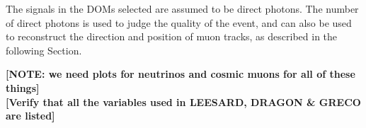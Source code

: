 \documentclass[../Main.tex]{subfiles}
\begin{document}
The signals in the DOMs selected are assumed to be direct photons. The number of direct photons is used to judge the quality of the event, and can also be used to reconstruct the direction and position of muon tracks, as described in the following Section.




\textbf{[NOTE: we need plots for neutrinos and cosmic muons for all of these things]}
\\
\textbf{[Verify that all the variables used in LEESARD, DRAGON \& GRECO are listed]}
\end{document}
